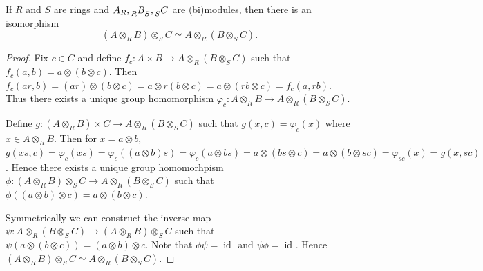 \documentclass{article}
\begin{document}
\begin{theorem}
    If $R$ and $S$ are rings and $A_R,\tensor[_R]{B}{_S},\tensor[_S]{C}{}$ are (bi)modules, then there is an isomorphism 
    \begin{equation*}
        (A \otimes_R B) \otimes_S C \simeq A \otimes_R (B \otimes_S C).
    \end{equation*}
\end{theorem}
\begin{proof}
    Fix $c \in C$ and define $f_c:A\times B\to A \otimes_R (B \otimes_S C)$ such that $f_c(a,b)=a \otimes (b \otimes c)$. Then $f_c(ar, b) = (ar) \otimes (b \otimes c) = a \otimes r(b \otimes c) = a \otimes (rb \otimes c) = f_c(a, rb)$. Thus there exists a unique group homomorphism $\varphi_c:A \otimes_R B \to A \otimes_R (B \otimes_S C)$. 
    
    Define $g:(A \otimes_R B)\times C\to A \otimes_R (B \otimes_S C)$ such that $g(x,c)=\varphi_c(x)$ where $x \in A \otimes_R B$. Then for $x=a \otimes b$, $g(xs,c)=\varphi_c(xs)=\varphi_c((a \otimes b)s)=\varphi_c(a \otimes bs)=a \otimes (bs \otimes c)=a \otimes (b \otimes sc)=\varphi_{sc}(x)=g(x,sc)$. Hence there exists a unique group homomorhpism $\phi:(A \otimes_R B) \otimes_S C\to A \otimes_R (B \otimes_S C)$ such that $\phi((a \otimes b)\otimes c)=a \otimes (b \otimes c)$.

    Symmetrically we can construct the inverse map $\psi:A \otimes_R (B \otimes_S C)\to (A \otimes_R B) \otimes_S C$ such that $\psi(a \otimes (b \otimes c))=(a \otimes b) \otimes c$. Note that $\phi \psi =\operatorname{id}_{}$ and $\psi \phi =\operatorname{id}_{}$. Hence $(A \otimes_R B) \otimes_S C \simeq A \otimes_R (B \otimes_S C)$.
\end{proof}
\end{document}
